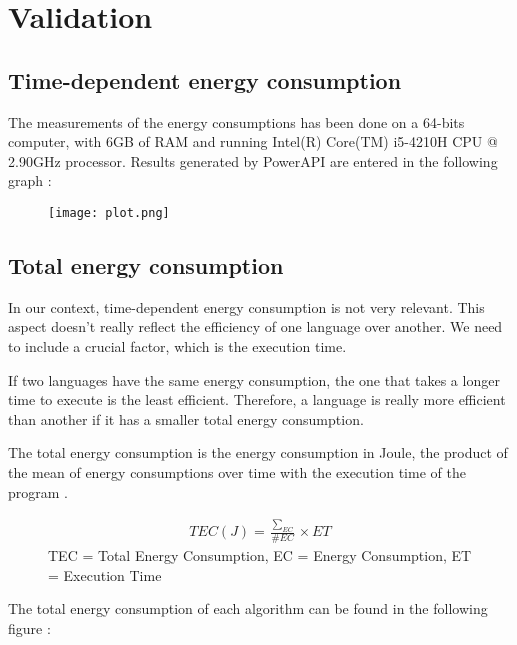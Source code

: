 \section{Validation}
\label{sec:Validation}
	\subsection{Time-dependent energy consumption}
	The measurements of the energy consumptions has been done on a 64-bits computer, with 6GB of RAM and running Intel(R) Core(TM) i5-4210H CPU @ 2.90GHz processor. Results generated by PowerAPI are entered in the following graph :
\begin{figure}[H]
	\texttt{[image: plot.png]}
\end{figure}

	\subsection{Total energy consumption}
	In our context, time-dependent energy consumption is not very relevant. This aspect doesn't really reflect the efficiency of one language over another. We need to include a crucial factor, which is the execution time.
	
	If two languages have the same energy consumption, the one that takes a longer time to execute is the least efficient. Therefore, a language is really more efficient than another if it has a smaller total energy consumption.
	
	The total energy consumption is the energy consumption in Joule, the product of the mean of energy consumptions over time with the execution time of the program \cite{joule}.
	
	\begin{figure}[H]
	\begin{gather*}
		TEC(J) = \frac{\sum\nolimits_{EC}}{\#EC} \times ET	
	\end{gather*}
	TEC = Total Energy Consumption, EC = Energy Consumption, ET = Execution Time
	\end{figure}
	
The total energy consumption of each algorithm can be found in the following figure :

